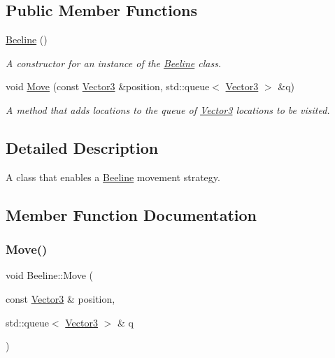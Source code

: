 \subsection*{Public Member Functions}
\begin{DoxyCompactItemize}
\item 
\mbox{\label{classBeeline_a352e1d94483d9a3a1e821f1386f23327}} 
\hyperlink{classBeeline_a352e1d94483d9a3a1e821f1386f23327}{Beeline} ()
\begin{DoxyCompactList}\small\item\em A constructor for an instance of the \hyperlink{classBeeline}{Beeline} class. \end{DoxyCompactList}\item 
void \hyperlink{classBeeline_a1af3f739bafa5a305e39f3b7f278b79d}{Move} (const \hyperlink{classVector3}{Vector3} \&position, std\+::queue$<$ \hyperlink{classVector3}{Vector3} $>$ \&q)
\begin{DoxyCompactList}\small\item\em A method that adds locations to the queue of \hyperlink{classVector3}{Vector3} locations to be visited. \end{DoxyCompactList}\end{DoxyCompactItemize}


\subsection{Detailed Description}
A class that enables a \hyperlink{classBeeline}{Beeline} movement strategy. 

\subsection{Member Function Documentation}
\mbox{\label{classBeeline_a1af3f739bafa5a305e39f3b7f278b79d}} 
\subsubsection{\texorpdfstring{Move()}{Move()}}
{\footnotesize\ttfamily void Beeline\+::\+Move (\begin{DoxyParamCaption}\item[{const \hyperlink{classVector3}{Vector3} \&}]{position,  }\item[{std\+::queue$<$ \hyperlink{classVector3}{Vector3} $>$ \&}]{q }\end{DoxyParamCaption})\hspace{0.3cm}{\ttfamily [virtual]}}



